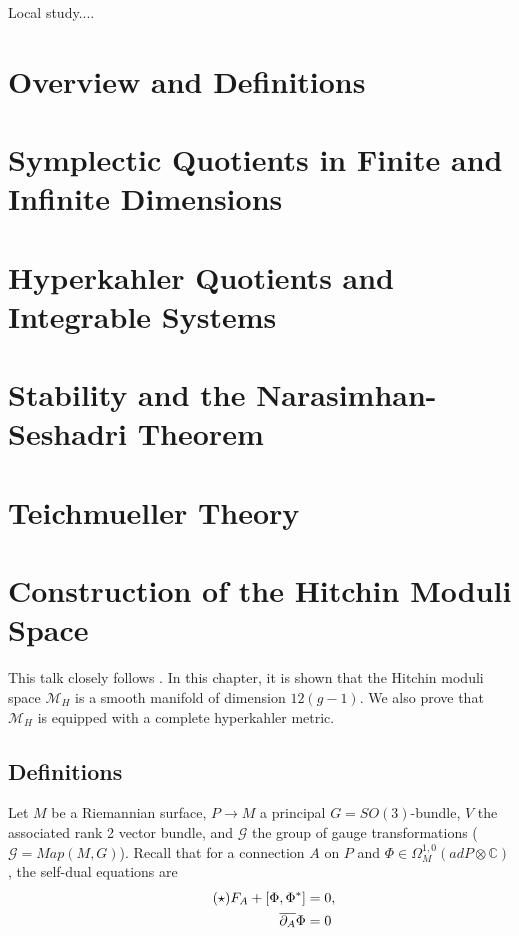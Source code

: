 \documentclass[oneside,english]{amsbook}
\numberwithin{section}{chapter}
\numberwithin{equation}{section}
\numberwithin{figure}{section}
\theoremstyle{plain}
\theoremstyle{definition}
\theoremstyle{remark}
\theoremstyle{definition}
\theoremstyle{definition}
\theoremstyle{plain}
\begin{document}
Local study....




\chapter{Overview and Definitions}


\chapter{Symplectic Quotients in Finite and Infinite Dimensions}


\chapter{Hyperkahler Quotients and Integrable Systems}


\chapter{Stability and the Narasimhan-Seshadri Theorem}


\chapter{Teichmueller Theory}


\chapter{Construction of the Hitchin Moduli Space}


This talk closely follows \cite{H1}. In this chapter, it is shown
that the Hitchin moduli space $\mathcal{M}_{H}$ is a smooth manifold
of dimension $12(g-1)$. We also prove that $\mathcal{M}_{H}$ is
equipped with a complete hyperkahler metric. 


\section{Definitions}

Let $M$ be a Riemannian surface, $P\rightarrow M$ a principal $G=SO\left(3\right)$-bundle,
$V$ the associated rank 2 vector bundle, and $\mathcal{G}$ the group
of gauge transformations ($\mathcal{G}=Map\left(M,G\right)$). Recall
that for a connection $A$ on $P$ and $\Phi\in\Omega_{M}^{1,0}\left(adP\otimes\mathbb{C}\right)$,
the self-dual equations are 
\begin{align*}
\tag{\ensuremath{\star}}F_{A}+\left[\Phi,\Phi^{*}\right] & =0,\\
\overline{\partial_{A}}\Phi & =0
\end{align*}
\end{document}
